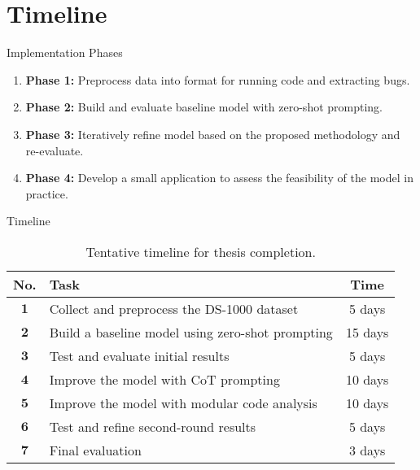 \section{Timeline}

\begin{frame}{Implementation Phases}
    \begin{enumerate}
        \item \textbf{Phase 1:} Preprocess data into format for running code and extracting bugs.

        \item \textbf{Phase 2:} Build and evaluate baseline model with zero-shot prompting.

        \item \textbf{Phase 3:} Iteratively refine model based on the proposed methodology and re-evaluate.

        \item \textbf{Phase 4:} Develop a small application to assess the feasibility of the model in practice.
    \end{enumerate}
\end{frame}

\begin{frame}{Timeline}
    \begin{table}[H]
        \caption{Tentative timeline for thesis completion.}
        \begin{center}
            \begin{tabular}{clc}
                \hline
                No.          & Task                                             & Time    \\
                \hline\hline
                $\mathbf{1}$ & Collect and preprocess the DS-1000 dataset       & 5 days  \\
                \hline
                $\mathbf{2}$ & Build a baseline model using zero-shot prompting & 15 days \\
                \hline
                $\mathbf{3}$ & Test and evaluate initial results                & 5 days  \\
                \hline
                $\mathbf{4}$ & Improve the model with CoT prompting             & 10 days \\
                \hline
                $\mathbf{5}$ & Improve the model with modular code analysis     & 10 days \\
                \hline
                $\mathbf{6}$ & Test and refine second-round results             & 5 days  \\
                \hline
                $\mathbf{7}$ & Final evaluation                                 & 3 days  \\
                \hline
            \end{tabular}
        \end{center}
    \end{table}
\end{frame}
